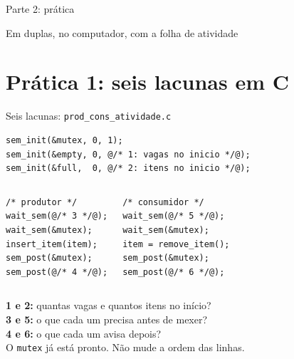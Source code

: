 \documentclass[aspectratio=169]{beamer}
\begin{document}
\begin{frame}[standout]
Parte 2: prática

\vspace{0.6em}
{\normalsize Em duplas, no computador, com a folha de atividade}
\end{frame}

\section{Prática 1: seis lacunas em C}

\begin{frame}[fragile]{Seis lacunas: \texttt{prod\_cons\_atividade.c}}
\begin{lstlisting}[style=codigo, basicstyle=\ttfamily\scriptsize\color{termfg}]
sem_init(&mutex, 0, 1);
sem_init(&empty, 0, @/* 1: vagas no inicio */@);
sem_init(&full,  0, @/* 2: itens no inicio */@);
\end{lstlisting}

\begin{columns}[T]
\begin{lstlisting}[style=codigo, basicstyle=\ttfamily\scriptsize\color{termfg}]
/* produtor */
wait_sem(@/* 3 */@);
wait_sem(&mutex);
insert_item(item);
sem_post(&mutex);
sem_post(@/* 4 */@);
\end{lstlisting}
\begin{lstlisting}[style=codigo, basicstyle=\ttfamily\scriptsize\color{termfg}]
/* consumidor */
wait_sem(@/* 5 */@);
wait_sem(&mutex);
item = remove_item();
sem_post(&mutex);
sem_post(@/* 6 */@);
\end{lstlisting}
\end{columns}

\footnotesize
\textbf{1 e 2:} quantas vagas e quantos itens no início?\\
\textbf{3 e 5:} o que cada um precisa antes de mexer?\\
\textbf{4 e 6:} o que cada um avisa depois?\\
O \texttt{mutex} já está pronto. Não mude a ordem das linhas.
\end{frame}
\end{document}
